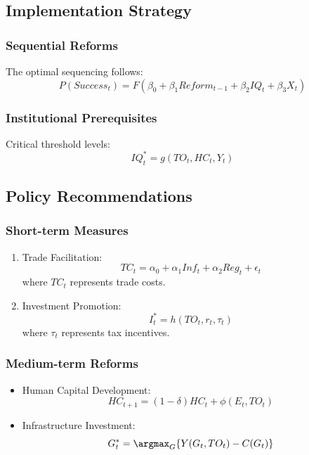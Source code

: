 \documentclass[12pt,a4paper]{article}
\theoremstyle{definition}
\begin{document}
\subsection{Implementation Strategy}
\subsubsection{Sequential Reforms}
The optimal sequencing follows:
\begin{equation}
P(Success_t) = F(\beta_0 + \beta_1 Reform_{t-1} + \beta_2 IQ_t + \beta_3 X_t)
\end{equation}

\subsubsection{Institutional Prerequisites}
Critical threshold levels:
\begin{equation}
IQ_t^* = g(TO_t, HC_t, Y_t)
\end{equation}

\subsection{Policy Recommendations}
\subsubsection{Short-term Measures}
\begin{enumerate}
    \item Trade Facilitation:
    \begin{equation}
    TC_t = \alpha_0 + \alpha_1 Inf_t + \alpha_2 Reg_t + \epsilon_t
    \end{equation}
    where $TC_t$ represents trade costs.
    
    \item Investment Promotion:
    \begin{equation}
    I_t^* = h(TO_t, r_t, \tau_t)
    \end{equation}
    where $\tau_t$ represents tax incentives.
\end{enumerate}

\subsubsection{Medium-term Reforms}
\begin{itemize}
    \item Human Capital Development:
    \begin{equation}
    HC_{t+1} = (1-\delta)HC_t + \phi(E_t, TO_t)
    \end{equation}
    
    \item Infrastructure Investment:
    \begin{equation}
    G_t^* = \argmax_G \{Y(G_t, TO_t) - C(G_t)\}
    \end{equation}
\end{itemize}
\end{document}
